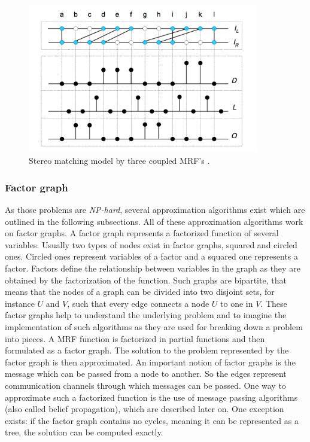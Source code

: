 \begin{figure}[h!]
  \centering
  \includegraphics[width=0.9\textwidth]{src/images/mrf-stereo-matching.png}
  \caption[Stereo matching model by three coupled MRF's]{Stereo matching model by three coupled MRF's \citep{sun2003stereo}.}
  \label{fig:mrf-stereo-matching}
\end{figure}

\subsubsection{Factor graph}

\noindent As those problems are \textit{NP-hard}, several approximation algorithms exist which are outlined in the following subsections.
All of these approximation algorithms work on factor graphs.
A factor graph represents a factorized function of several variables.
Usually two types of nodes exist in factor graphs, squared and circled ones.
Circled ones represent variables of a factor and a squared one represents a factor.
Factors define the relationship between variables in the graph as they are obtained by the factorization of the function.
Such graphs are bipartite, that means that the nodes of a graph can be divided into two disjoint sets, for instance $U$ and $V$, such that every edge connects a node $U$ to one in $V$.
These factor graphs help to understand the underlying problem and to imagine the implementation of such algorithms as they are used for breaking down a problem into pieces.
\newline\newline\noindent A MRF function is factorized in partial functions and then formulated as a factor graph.
The solution to the problem represented by the factor graph is then approximated.
An important notion of factor graphs is the message which can be passed from a node to another.
So the edges represent communication channels through which messages can be passed.
One way to approximate such a factorized function is the use of message passing algorithms (also called belief propagation), which are described later on.
One exception exists: if the factor graph contains no cycles, meaning it can be represented as a tree, the solution can be computed exactly.

